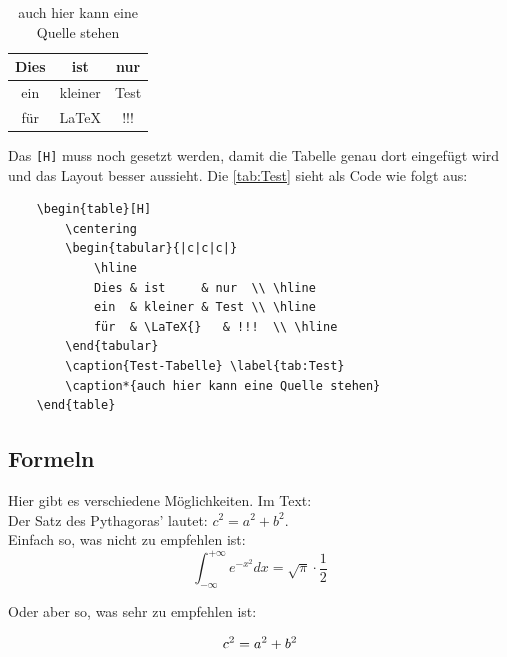 \begin{table}[H]
	\centering
	\begin{tabular}{|c|c|c|}
		\hline
		Dies    & ist       & nur  \\ \hline
		ein     & kleiner   & Test \\ \hline
		für     & \LaTeX{}  & !!!  \\ \hline
	\end{tabular}
	\caption{Test-Tabelle} \label{tab:Test}
	\caption*{auch hier kann eine Quelle stehen}
\end{table}

Das \verb|[H]| muss noch gesetzt werden, damit die Tabelle genau dort eingefügt wird und das Layout besser aussieht. Die \autoref{tab:Test} sieht als Code wie folgt aus:

\begin{verbatim}
    \begin{table}[H]
        \centering
        \begin{tabular}{|c|c|c|}
            \hline
            Dies & ist     & nur  \\ \hline
            ein  & kleiner & Test \\ \hline
            für  & \LaTeX{}   & !!!  \\ \hline
        \end{tabular}
        \caption{Test-Tabelle} \label{tab:Test}
        \caption*{auch hier kann eine Quelle stehen}
    \end{table}
\end{verbatim}


\subsection{Formeln}

Hier gibt es verschiedene Möglichkeiten. Im Text:\\
Der Satz des Pythagoras' lautet: $c^2 = a^2 + b^2$. \\
Einfach so, was nicht zu empfehlen ist: \\
\[\label{eq:GaußschesFehlerintegral}
\int_{-\infty}^{+\infty} e^{-x^2} dx = \sqrt{\pi} \cdot \frac{1}{2}
\]

Oder aber so, was sehr zu empfehlen ist:

\begin{equation}
	\numberwithin{equation}{section}
	c^2 = a^2 + b^2 \label{eq:Pythagoras} \\
\end{equation}

